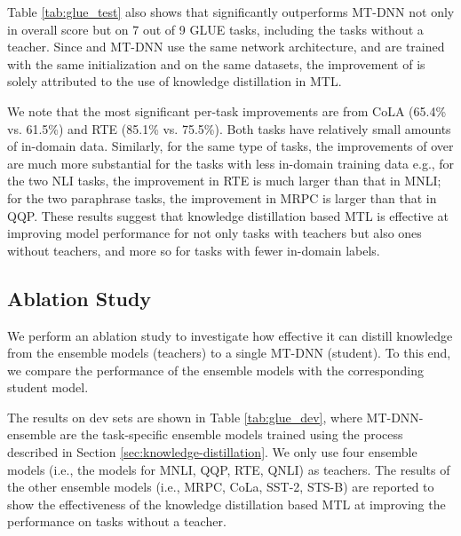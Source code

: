 Table \ref{tab:glue_test} also shows that {\NMNAME} significantly outperforms MT-DNN not only in overall score but on 7 out of 9 GLUE tasks, including the tasks without a teacher.
Since {\NMNAME} and MT-DNN use the same network architecture, and are trained with the same initialization and on the same datasets, the improvement of {\NMNAME} is solely attributed to the use of knowledge distillation in MTL. 


We note that the most significant per-task improvements are from CoLA (65.4\% vs. 61.5\%) and RTE (85.1\% vs. 75.5\%). Both tasks have relatively small amounts of in-domain data. Similarly, for the same type of tasks, the improvements of {\NMNAME} over {\MNAME} are much more substantial for the tasks with less in-domain training data e.g., for the two NLI tasks, the improvement in RTE is much larger than that in MNLI;  for the two paraphrase tasks, the improvement in  MRPC is larger than that in QQP. 
These results suggest that knowledge distillation based MTL is  effective at improving model performance for not only tasks with teachers but also ones without teachers, and more so for tasks with fewer in-domain labels.





\subsection{Ablation Study}


We perform an ablation study to investigate how effective it can distill knowledge from the ensemble models (teachers) to a single MT-DNN (student). To this end, we compare the performance of the ensemble models with the corresponding student model. 

The results on dev sets are shown in Table \ref{tab:glue_dev}, where MT-DNN-ensemble are the task-specific ensemble models trained using the process described in Section \ref{sec:knowledge-distillation}. We only use four ensemble models (i.e., the models for MNLI, QQP, RTE, QNLI) as teachers. The results of the other ensemble models (i.e., MRPC, CoLa, SST-2, STS-B) are reported to show the effectiveness of the knowledge distillation based MTL at improving the performance on tasks without a teacher.

